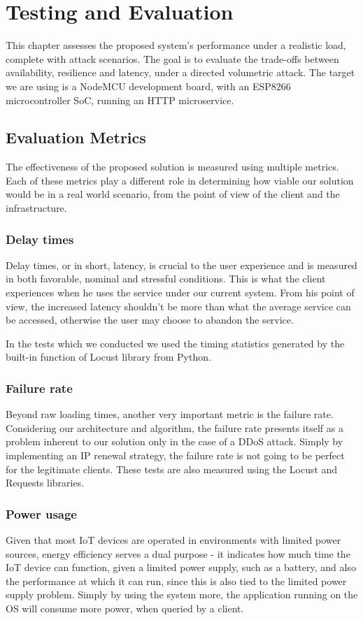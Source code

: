 \chapter{Testing and Evaluation}
\label{chap:testing}
This chapter assesses the proposed system's performance under a realistic load, complete with attack scenarios. The goal is to evaluate the trade-offs between availability, resilience and latency, under a directed volumetric attack. The target we are using is a NodeMCU development board, with an ESP8266 microcontroller SoC, running an HTTP microservice.

\section{Evaluation Metrics}
The effectiveness of the proposed solution is measured using multiple metrics. Each of these metrics play a different role in determining how viable our solution would be in a real world scenario, from the point of view of the client and the infrastructure.

\subsection{Delay times}
Delay times, or in short, latency, is crucial to the user experience and is measured in both favorable, nominal and stressful conditions. This is what the client experiences when he uses the service under our current system. From his point of view, the increased latency shouldn't be more than what the average service can be accessed, otherwise the user may choose to abandon the service.

In the tests which we conducted we used the timing statistics generated by the built-in function of Locust library from Python.

\subsection{Failure rate}
Beyond raw loading times, another very important metric is the failure rate. Considering our architecture and algorithm, the failure rate presents itself as a problem inherent to our solution only in the case of a DDoS attack. Simply by implementing an IP renewal strategy, the failure rate is not going to be perfect for the legitimate clients. These tests are also measured using the Locust and Requests libraries. 


\subsection{Power usage}
Given that most IoT devices are operated in environments with limited power sources, energy efficiency serves a dual purpose - it indicates how much time the IoT device can function, given a limited power supply, such as a battery, and also the performance at which it can run, since this is also tied to the limited power supply problem. Simply by using the system more, the application running on the OS will consume more power, when queried by a client.

